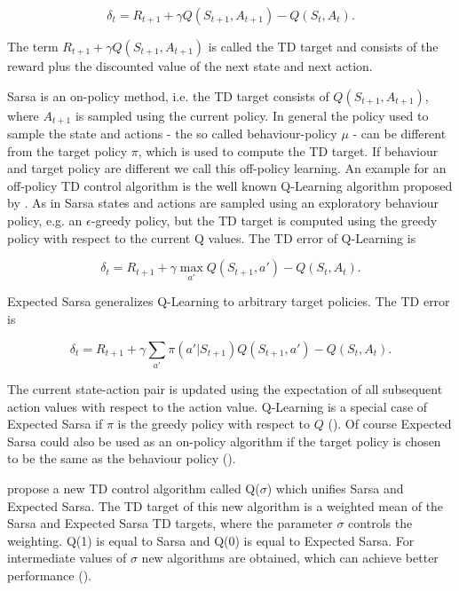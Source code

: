\documentclass{article} %
\begin{document}
\begin{equation} 
\delta_t = R_{t+1} + \gamma Q(S_{t+1}, A_{t+1}) - Q(S_t, A_t).
\label{sarsa}
\end{equation}

The term $R_{t+1} + \gamma Q(S_{t+1}, A_{t+1})$ is called the TD target and consists of the reward plus the discounted value of the next state and next action.

Sarsa is an on-policy method, i.e. the TD target consists of $Q(S_{t+1}, A_{t+1})$, where $A_{t+1}$ is sampled using the current policy. In general the policy used to sample the state and actions - the so called behaviour-policy $\mu$ - can be different from the target policy $\pi$, which is used to compute the TD target. If behaviour and target policy are different we call this off-policy learning. An example for an off-policy TD control algorithm is the well known Q-Learning algorithm proposed by \cite{watkins1989}. As in Sarsa states and actions are sampled using an exploratory behaviour policy, e.g. an $\epsilon$-greedy policy, but the TD target is computed using the greedy policy with respect to the current Q values. The TD error of Q-Learning is

\begin{equation} 
\delta_t = R_{t+1} + \gamma \max_{a'} Q(S_{t+1}, a') - Q(S_t, A_t).
\label{qlearning}
\end{equation}

Expected Sarsa generalizes Q-Learning to arbitrary target policies. The TD error is

\begin{equation} 
\delta_t = R_{t+1} + \gamma \sum_{a'} \pi(a' | S_{t+1}) Q(S_{t+1}, a') - Q(S_t, A_t).
\label{equ:expectedsarsa}
\end{equation}

The current state-action pair is updated using the expectation of all subsequent action values with respect to the action value. Q-Learning is a special case of Expected Sarsa if $\pi$ is the greedy policy with respect to $Q$ (\cite{sutton2017}). Of course Expected Sarsa could also be used as an on-policy algorithm if the target policy is chosen to be the same as the behaviour policy (\cite{expsarsa}).

\cite{sutton2017} propose a new TD control algorithm called Q($\sigma$) which unifies Sarsa and Expected Sarsa. The TD target of this new algorithm is a weighted mean of the Sarsa and Expected Sarsa TD targets, where the parameter $\sigma$ controls the weighting. Q(1) is equal to Sarsa and Q(0) is equal to Expected Sarsa. For intermediate values of $\sigma$ new algorithms are obtained, which can achieve better performance (\cite{deasis2017}).
\end{document}
